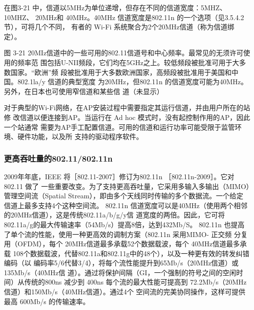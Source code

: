 在图3-21 中，信道以5MHz为单位递增，但存在不同的信道宽度：5MHZ、10MHZ、
20MHz和 40MHz。40MHz 信道宽度是802.11n 的一个选项（见3.5.4.2节），可将几个不同，
有者的 Wi-Fi 系统聚合为2个20MHz信道（称为信道绑定）。


图 3-21
20MIz信道中的一些可用的802.11信道号和中心频率。最常见的无须许可使用的频率范
围包括U-NII频段，它们均在5GHz之上。较低频段被批准可用于大多数国家。“欧洲”频
段被批准用于大多数欧洲国家，高频段被批准用于美国和中国。802.1la/y 信道的典型宽度
为20MHz，但802.11n 的信道宽度可能为40MHz。另外，在日本也可使用窄信道和某些信
道（未显示）

对于典型的Wi-Fi网络，在AP安装过程中需要指定其运行信道，并由用户所在的站修
改信道以便连接到AP。当运行在 Ad hoc 模式时，没有起控制作用的AP，因此一个站通常
需要为AP手工配置信道。可用的信道和运行功率可能受限于监管环境、硬件功能，以及所
支持的驱动程序软件。

\subsubsection{更高吞吐量的802.11/802.11n}

2009年年底，IEEE 将［802.11-2007］修订为802.11n ［802.11n-2009］。它对802.11 做了
一些重要改变。为了支持更高吞吐量，它采用多输入多输出（MIMO）管理空间流（Spatial
Stream），即由多个天线同时传输的多个数据流。一个给定信道上最多支持4个这种空间流。
802.11n 信道宽度可以是40MHz（使用两个相邻的20MHz信道），这是传统802.11a/b/g/y信
道宽度的两倍。因此，它可将 802.11a/g的最大传输速率（54Mb/s）提高8倍，达到432Mb/S。
802.11n 也提高了单个流的性能，使用一种更高效的调制方案（802.11n 采用MIMO- 正交频
分复用（OFDM），每个 20MHz信道最多承载52个数据载波，每个 40MHz信道最多承载
108个数据载波，代替802.11a和802.11g中的48个），以及一种更有效的转发纠错编码（以
编码率5/6代替3/4），将每个流性能提升到65Mb/s（20MHz信道）或135Mb/s（40MHz信
道）。通过将保护间隔（GI，一个强制的符号之间的空闲时间）从传统的800ns 减少到 400ns
每个流的最大性能可提高到 72.2Mb/s（20MHz信道）和150Mb/s（40MHz信道）。通过4个
空间流的完美协同操作，这样可提供最高 600Mb/s 的传输速率。

